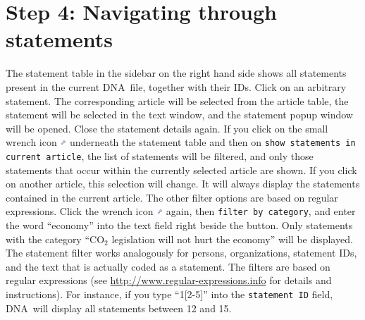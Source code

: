\documentclass[12pt,a4paper]{scrreprt}
\newcommand{\dnashort}{\textsc{DNA}}
\newcommand{\code}[1]{\texttt{#1}}
\begin{document}
\section*{Step 4: Navigating through statements}
The statement table in the sidebar on the right hand side shows all statements present in the current \dnashort\ file, together with their IDs. Click on an arbitrary statement. The corresponding article will be selected from the article table, the statement will be selected in the text window, and the statement popup window will be opened. Close the statement details again. If you click on the small wrench icon \includegraphics[height=9px]{bullet_wrench.png} underneath the statement table and then on \code{show statements in current article}, the list of statements will be filtered, and only those statements that occur within the currently selected article are shown. If you click on another article, this selection will change. It will always display the statements contained in the current article. The other filter options are based on regular expressions. Click the wrench icon \includegraphics[height=9px]{bullet_wrench.png} again, then \code{filter by category}, and enter the word ``economy'' into the text field right beside the button. Only statements with the category ``CO$_2$ legislation will not hurt the economy'' will be displayed. The statement filter works analogously for persons, organizations, statement IDs, and the text that is actually coded as a statement. The filters are based on regular expressions (see \url{http://www.regular-expressions.info} for details and instructions). For instance, if you type ``1[2-5]'' into the \code{statement ID} field, \dnashort\ will display all statements between 12 and 15.
\end{document}
